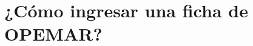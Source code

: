 \documentclass[a4paper,oneside,11pt]{book}
\begin{document}
 \begin{figure} [!h]
   \begin{center}
    \end{center}
    \end{figure}
  
 
 
 
 
 
\chapter{¿Cómo ingresar una ficha de OPEMAR?}
 
 
\end{document}
